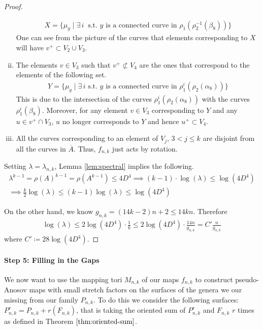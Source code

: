 \begin{proof}
\begin{enumerate}[(i)]
\begin{align*}
    X = \{\mu_y \mid \exists \,i\ \text{ s.t. $y$ is a connected curve in } \rho_1(\rho_2^{-1}(\beta_8))\}
  \end{align*}
  One can see from the picture of the curves that elements corresponding to $X$ will have
  $v^+ \subset V_2 \cup V_3$.
\item The elements $v \in V_3$ such that $v^+ \not\subset V_4$ are the ones that correspond to the elements of
  the following set.
  \begin{align*}
    Y = \{\mu_y \mid \exists \,i \text{ s.t. $y$ is a connected curve in } \rho_1^i(\rho_2(\alpha_8))\}
  \end{align*}
  This is due to the intersection of the curves $\rho_1^i(\rho_2(\alpha_8))$ with the curves
  $\rho_1^i(\beta_8)$. Moreover, for any element $v \in V_3$ corresponding to $Y$ and any
  $u \in v^+ \cap V_3$, $u$ no longer corresponds to $Y$ and hence $u^+ \subset V_4$.
\item All the curves corresponding to an element of $V_j$, $3 < j \leq k$ are disjoint from all the curves in
  $\overline{A}$. Thus, $f_{n,k}$ just acts by rotation.
\end{enumerate}

Setting $\lambda = \lambda_{n,k}$, Lemma \ref{lem:spectral} implies the following.
\begin{gather*}
    \lambda^{k-1} = \rho(A)^{k-1} = \rho(A^{k-1}) \leq 4D^4 \implies (k-1)\cdot \log(\lambda) \leq \log(4D^4) \\
    \implies \frac{k}{2}\log(\lambda) \leq (k-1)\log(\lambda) \leq \log(4D^4)
\end{gather*}

On the other hand, we know $g_{n,k} = (14k - 2)n + 2 \leq 14kn$. Therefore
\begin{align*}
    \log(\lambda) \leq 2\log(4D^4)\cdot\frac{1}{k} \leq 2\log(4D^4)\cdot \frac{14n}{g_{n,k}} = C'\frac{n}{g_{n,k}}
\end{align*}
where $C' \coloneqq 28\log(4D^4)$.
\end{proof}

\paragraph{Step 5: Filling in the Gaps}

We now want to use the mapping tori $M_{n,k}$ of our maps $f_{n,k}$ to construct pseudo-Anosov maps with small
stretch factors on the surfaces of the genera we our missing from our family $P_{n,k}$. To do this we consider
the following surfaces: $P^r_{n,k} = P_{n,k} + r(F_{n,k})$, that is taking the oriented sum of $P^r_{n,k}$ and
$F_{n,k}$ $r$ times as defined in Theorem $\ref{thm:oriented-sum}$.

